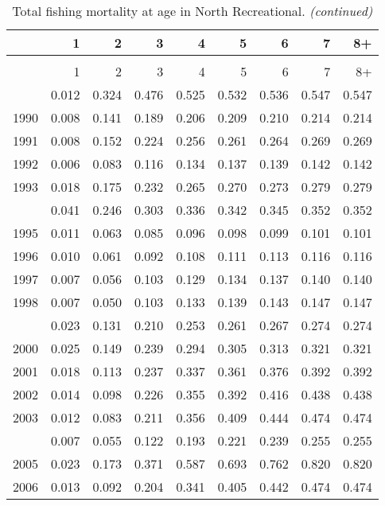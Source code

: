 \documentclass[
]{article}
\begin{document}
\begin{longtable}[t]{lrrrrrrrr}
\caption{\label{tab:North_Recreational-fleet-FAA-table}Total fishing mortality at age in North Recreational.}\\
\toprule
  & 1 & 2 & 3 & 4 & 5 & 6 & 7 & 8+\\
\midrule
\endfirsthead
\caption[]{Total fishing mortality at age in North Recreational. \textit{(continued)}}\\
\toprule
  & 1 & 2 & 3 & 4 & 5 & 6 & 7 & 8+\\
\midrule
\endhead

\endfoot
\bottomrule
\endlastfoot
1989 & 0.012 & 0.324 & 0.476 & 0.525 & 0.532 & 0.536 & 0.547 & 0.547\\
1990 & 0.008 & 0.141 & 0.189 & 0.206 & 0.209 & 0.210 & 0.214 & 0.214\\
1991 & 0.008 & 0.152 & 0.224 & 0.256 & 0.261 & 0.264 & 0.269 & 0.269\\
1992 & 0.006 & 0.083 & 0.116 & 0.134 & 0.137 & 0.139 & 0.142 & 0.142\\
1993 & 0.018 & 0.175 & 0.232 & 0.265 & 0.270 & 0.273 & 0.279 & 0.279\\
\addlinespace
1994 & 0.041 & 0.246 & 0.303 & 0.336 & 0.342 & 0.345 & 0.352 & 0.352\\
1995 & 0.011 & 0.063 & 0.085 & 0.096 & 0.098 & 0.099 & 0.101 & 0.101\\
1996 & 0.010 & 0.061 & 0.092 & 0.108 & 0.111 & 0.113 & 0.116 & 0.116\\
1997 & 0.007 & 0.056 & 0.103 & 0.129 & 0.134 & 0.137 & 0.140 & 0.140\\
1998 & 0.007 & 0.050 & 0.103 & 0.133 & 0.139 & 0.143 & 0.147 & 0.147\\
\addlinespace
1999 & 0.023 & 0.131 & 0.210 & 0.253 & 0.261 & 0.267 & 0.274 & 0.274\\
2000 & 0.025 & 0.149 & 0.239 & 0.294 & 0.305 & 0.313 & 0.321 & 0.321\\
2001 & 0.018 & 0.113 & 0.237 & 0.337 & 0.361 & 0.376 & 0.392 & 0.392\\
2002 & 0.014 & 0.098 & 0.226 & 0.355 & 0.392 & 0.416 & 0.438 & 0.438\\
2003 & 0.012 & 0.083 & 0.211 & 0.356 & 0.409 & 0.444 & 0.474 & 0.474\\
\addlinespace
2004 & 0.007 & 0.055 & 0.122 & 0.193 & 0.221 & 0.239 & 0.255 & 0.255\\
2005 & 0.023 & 0.173 & 0.371 & 0.587 & 0.693 & 0.762 & 0.820 & 0.820\\
2006 & 0.013 & 0.092 & 0.204 & 0.341 & 0.405 & 0.442 & 0.474 & 0.474\\

\end{longtable}
\end{document}
